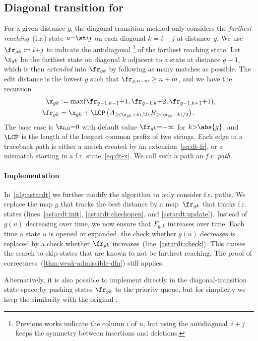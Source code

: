 \subsection{Diagonal transition for \A}\label{sec:dt}

For a given distance $g$, the diagonal transition method only considers the
\emph{farthest-reaching}~(f.r.) state $u{=}\st ij$ on each diagonal $k{=}i{-}j$
at distance~$g$. We use $\fr_{gk} := i{+}j$ to indicate the antidiagonal%
\footnote{Previous works indicate the column $i$ of $u$, but using the
antidiagonal~$i{+}j$ keeps the symmetry between insertions and deletions.}
of the farthest reaching state. Let $\x_{gk}$ be the farthest state
on diagonal $k$ adjacent to a state at distance $g{-}1$, which is then
\emph{extended} into $\fr_{gk}$ by following as many matches as possible. The
edit distance is the lowest $g$ such that $\fr_{g,n{-}m} \geq n+m$, and we have
the recursion
\begin{align}
  \x_{gk} &:= \max(\fr_{g{-}1, k{-}1}{+}1, \fr_{g{-}1, k}{+}2, \fr_{g{-}1, k{+}1}{+}1),\label{eq:dt-x}\\
  \fr_{gk} &= \x_{gk} + \LCP\left(A_{\geq (\x_{gk}+k)/2}, B_{\geq (\x_{gk}-k)/2}\right).\label{eq:dt-fr}
\end{align}
The base case is $\x_{0,0} {=} 0$ with default value $\fr_{gk}{=}{-}\infty$ for
$k {>} \abs{g}$, and $\LCP$ is the length of the longest common prefix of two
strings. Each edge in a traceback path is either a match created by an
extension~\eqref{eq:dt-fr}, or a mismatch starting in a f.r.
state~\eqref{eq:dt-x}. We call such a path an \emph{{f.r. path}}.

\paragraph{Implementation}
In~\cref{alg:astardt} we further modify the \A algorithm to only consider f.r.
paths.  We replace the map $g$ that tracks the best distance by a map~$\fr_{gk}$
that tracks f.r. states (lines~\ref{astardt:init}, \ref{astardt:checkopen}, and
\ref{astardt:update}).  Instead of $g(u)$ decreasing over time, we now ensure
that $F_{g,k}$ increases over time.  Each time a state $u$ is opened or
expanded, the check whether $g(u)$ decreases is replaced by a check whether
$\fr_{gk}$ increases~(line~\ref{astardt:check}).  This causes the search to skip
states that are known to not be farthest reaching. The proof of
correctness~(\cref{thm:weak-admissible-dfn}) still applies.

Alternatively, it is also possible to implement \A directly in the
diagonal-transition state-space by pushing states $\fr_{gk}$ to the priority
queue, but for simplicity we keep the similarity with the original \A.


